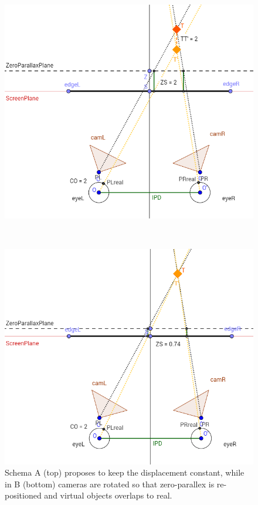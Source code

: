 \begin{figure} 
\centering   
\begin{minipage}[t]{0.75\textwidth}
\includegraphics[width=\linewidth]{schemas/stereo_eye_constant_discrepancy}
\end{minipage}
\\
\begin{minipage}[t]{0.75\textwidth}
\includegraphics[width=\linewidth]{schemas/stereo_eye_corrected_discrepancy}
\end{minipage}
\caption{Schema A (top) proposes to keep the displacement constant, while in B (bottom) cameras are rotated so that zero-parallex is re-positioned and virtual objects overlaps to real.}
\label{fig:stereo_eye_managed_discrepancy}
\end{figure}

